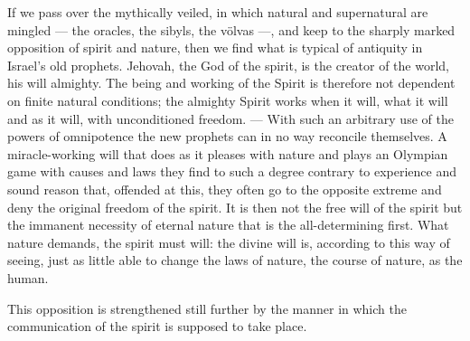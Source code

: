 \documentclass[12pt,a4paper,openany]{book}
\newcommand{\opage}[1]{\marginnote{\footnotesize\textit{[#1]}}}
\begin{document}
If we pass over the mythically veiled, in which natural
and supernatural are mingled --- the oracles, the sibyls,
the völvas ---, and keep to the sharply marked
opposition of spirit and nature, then we find
\setcounter{footnote}{0}%
\opage{8}what is typical of antiquity in Israel's old prophets.
Jehovah, the God of the spirit, is the creator of the world, his will
almighty. The being and working of the Spirit is therefore not
dependent on finite natural conditions; the almighty
Spirit works when it will, what it will and as it
will, with unconditioned freedom. --- With such an arbitrary
use of the powers of omnipotence the new prophets can in
no way reconcile themselves. A miracle-working will
that does as it pleases with nature and plays
an Olympian game with causes and laws they find to such a
degree contrary to experience and sound reason that,
offended at this, they often go to the opposite extreme
and deny the original freedom of the spirit. It is
then not the free will of the spirit but the immanent necessity of eternal
nature that is the all-determining
first. What nature demands, the spirit must will: the
divine will is, according to this way of seeing, just
as little able to change the laws of nature, the course of nature,
as the human.

This opposition is strengthened still further by
the manner in which the communication of the spirit is supposed to
take place.
\end{document}
